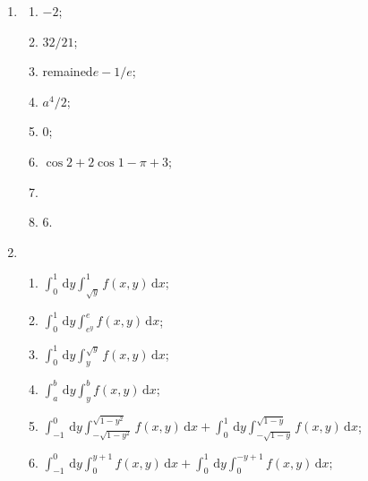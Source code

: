% 
\begin{enumerate}
    \item %
        \begin{multicols}{2}
            \begin{enumerate}[(1)]
                \item %
                    $-2$;
                \item %
                    $32/21$;
                \item %
                    {\color{red}remained}$e-1/e$; 
                \item %
                    $a^4/2$;
                \item %
                    $0$;
                \item %
                    $\cos2 + 2\cos1 - \pi + 3$;
                \item %
                \item %
                    $6$.
            \end{enumerate}
        \end{multicols}
    \item %
        \begin{enumerate}[(1)]
            \item %
                $\displaystyle{\int_0^1\,\mathrm{d}y\int_{\sqrt{y}}^1f(x,y)\,\mathrm{d}x}$;
            \item %
                $\displaystyle{\int_0^1\,\mathrm{d}y\int_{e^y}^ef(x,y)\,\mathrm{d}x}$;
            \item %
                $\displaystyle{\int_0^1\,\mathrm{d}y\int_y^{\sqrt{y}}}f(x,y)\,\mathrm{d}x$;
            \item %
                $\displaystyle{\int_a^b\,\mathrm{d}y\int_y^bf(x,y)\,\mathrm{d}x}$;
            \item %
                $\displaystyle{\int_{-1}^0\,\mathrm{d}y\int_{-\sqrt{1-y^2}}^{\sqrt{1-y^2}}f(x,y)\,\mathrm{d}x + \int_0^1\,\mathrm{d}y\int_{-\sqrt{1-y}}^{\sqrt{1-y}}f(x,y)\,\mathrm{d}x}$;
            \item %
                $\displaystyle{\int_{-1}^0\,\mathrm{d}y\int_0^{y+1}f(x,y)\,\mathrm{d}x + \int_0^1\,\mathrm{d}y\int_0^{-y+1}f(x,y)\,\mathrm{d}x}$;

\end{enumerate}
\end{enumerate}
